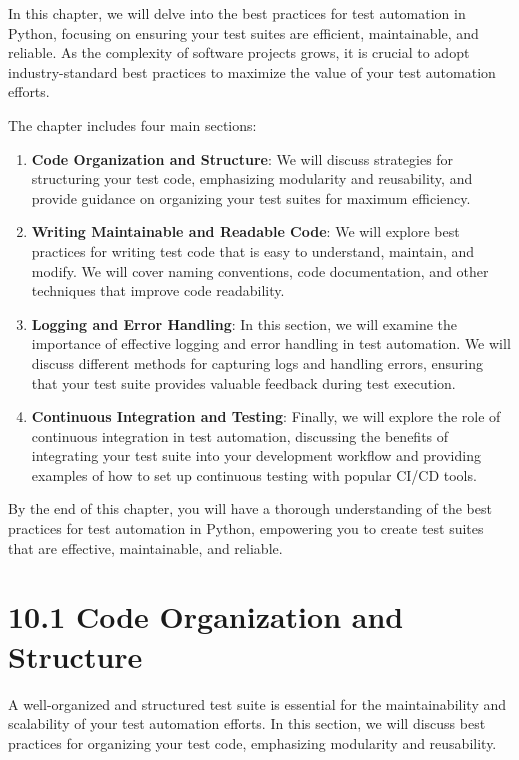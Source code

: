 \documentclass[
  paper=a4,
  ,captions=tableheading
]{scrartcl}
\begin{document}
In this chapter, we will delve into the best practices for test
automation in Python, focusing on ensuring your test suites are
efficient, maintainable, and reliable. As the complexity of software
projects grows, it is crucial to adopt industry-standard best practices
to maximize the value of your test automation efforts.

The chapter includes four main sections:

\begin{enumerate}
\def\labelenumi{\arabic{enumi}.}
\item
  \textbf{Code Organization and Structure}: We will discuss strategies
  for structuring your test code, emphasizing modularity and
  reusability, and provide guidance on organizing your test suites for
  maximum efficiency.
\item
  \textbf{Writing Maintainable and Readable Code}: We will explore best
  practices for writing test code that is easy to understand, maintain,
  and modify. We will cover naming conventions, code documentation, and
  other techniques that improve code readability.
\item
  \textbf{Logging and Error Handling}: In this section, we will examine
  the importance of effective logging and error handling in test
  automation. We will discuss different methods for capturing logs and
  handling errors, ensuring that your test suite provides valuable
  feedback during test execution.
\item
  \textbf{Continuous Integration and Testing}: Finally, we will explore
  the role of continuous integration in test automation, discussing the
  benefits of integrating your test suite into your development workflow
  and providing examples of how to set up continuous testing with
  popular CI/CD tools.
\end{enumerate}

By the end of this chapter, you will have a thorough understanding of
the best practices for test automation in Python, empowering you to
create test suites that are effective, maintainable, and reliable.

\hypertarget{code-organization-and-structure}{%
\section{10.1 Code Organization and
Structure}\label{code-organization-and-structure}}

A well-organized and structured test suite is essential for the
maintainability and scalability of your test automation efforts. In this
section, we will discuss best practices for organizing your test code,
emphasizing modularity and reusability.
\end{document}
